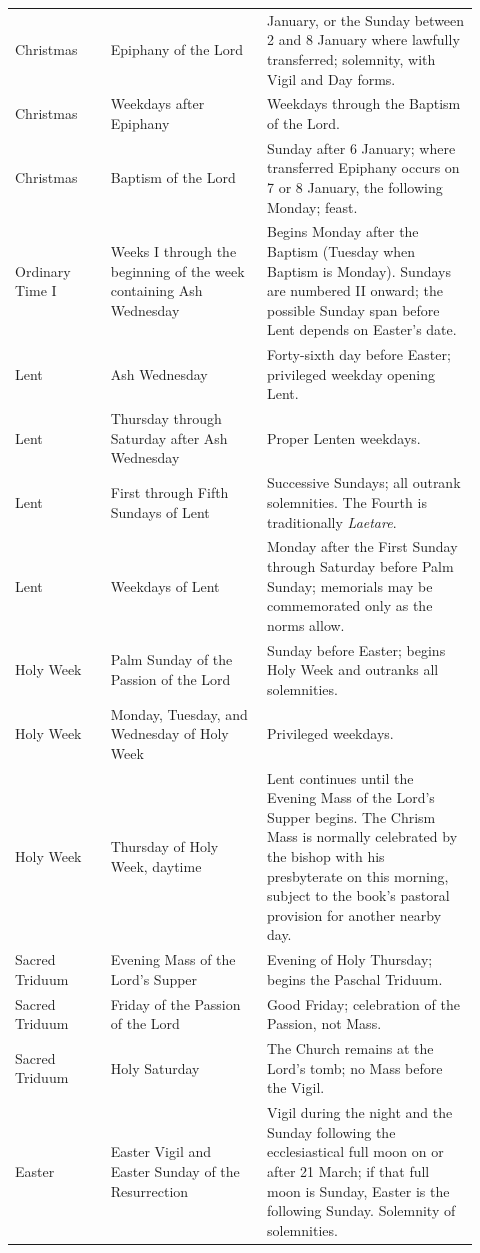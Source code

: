 \begin{longtable}{>{\raggedright\arraybackslash}p{0.19\linewidth}>{\raggedright\arraybackslash}p{0.31\linewidth}>{\raggedright\arraybackslash}p{0.42\linewidth}}
Christmas & Epiphany of the Lord & 6 January, or the Sunday between 2 and 8 January where lawfully transferred; solemnity, with Vigil and Day forms.\\
Christmas & Weekdays after Epiphany & Weekdays through the Baptism of the Lord.\\
Christmas & Baptism of the Lord & Sunday after 6 January; where transferred Epiphany occurs on 7 or 8 January, the following Monday; feast.\\
Ordinary Time I & Weeks I through the beginning of the week containing Ash Wednesday & Begins Monday after the Baptism (Tuesday when Baptism is Monday). Sundays are numbered II onward; the possible Sunday span before Lent depends on Easter's date.\\
Lent & Ash Wednesday & Forty-sixth day before Easter; privileged weekday opening Lent.\\
Lent & Thursday through Saturday after Ash Wednesday & Proper Lenten weekdays.\\
Lent & First through Fifth Sundays of Lent & Successive Sundays; all outrank solemnities. The Fourth is traditionally \emph{Laetare}.\\
Lent & Weekdays of Lent & Monday after the First Sunday through Saturday before Palm Sunday; memorials may be commemorated only as the norms allow.\\
Holy Week & Palm Sunday of the Passion of the Lord & Sunday before Easter; begins Holy Week and outranks all solemnities.\\
Holy Week & Monday, Tuesday, and Wednesday of Holy Week & Privileged weekdays.\\
Holy Week & Thursday of Holy Week, daytime & Lent continues until the Evening Mass of the Lord's Supper begins. The Chrism Mass is normally celebrated by the bishop with his presbyterate on this morning, subject to the book's pastoral provision for another nearby day.\\
Sacred Triduum & Evening Mass of the Lord's Supper & Evening of Holy Thursday; begins the Paschal Triduum.\\
Sacred Triduum & Friday of the Passion of the Lord & Good Friday; celebration of the Passion, not Mass.\\
Sacred Triduum & Holy Saturday & The Church remains at the Lord's tomb; no Mass before the Vigil.\\
Easter & Easter Vigil and Easter Sunday of the Resurrection & Vigil during the night and the Sunday following the ecclesiastical full moon on or after 21 March; if that full moon is Sunday, Easter is the following Sunday. Solemnity of solemnities.\\

\end{longtable}

